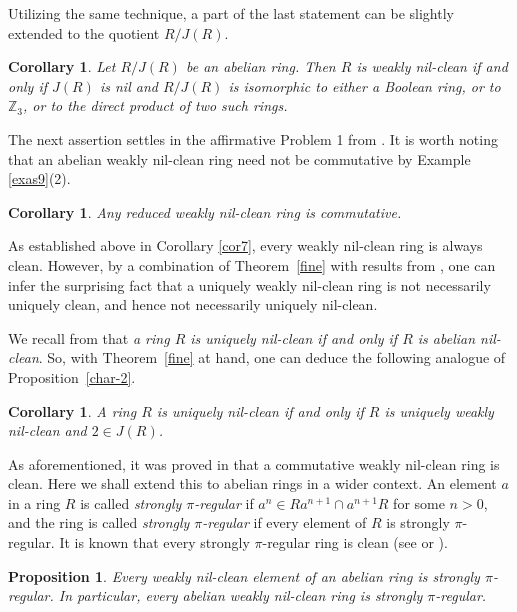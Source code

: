 \documentclass[12]{amsart}
\newtheorem{cor}[thm]{Corollary}
\newtheorem{prop}[thm]{Proposition}
\theoremstyle{definition}
\numberwithin{equation}{section}
\begin{document}
Utilizing the same technique, a part of the last statement can be slightly extended to the quotient $R/J(R)$.

\begin{cor}
Let $R/J(R)$ be an abelian ring. Then $R$ is weakly nil-clean if and only if $J(R)$ is nil and $R/J(R)$ is isomorphic to either a Boolean ring, or to $\mathbb Z_3$, or to the direct product of two such rings.
\end{cor}

The next assertion settles in the affirmative Problem 1 from \cite{DM14}. 
It is worth noting that an abelian weakly nil-clean ring need not be commutative by Example \ref{exas9}(2).

\begin{cor}\label{commut}
Any reduced weakly nil-clean ring is commutative.
\end{cor}

As established above in Corollary \ref{cor7}, every weakly nil-clean ring is always clean. However, by a combination of Theorem~\ref{fine} with results from \cite{NZ04}, one can infer the surprising fact that a uniquely weakly nil-clean ring is not necessarily uniquely clean, and hence not necessarily uniquely nil-clean.

We recall from \cite[Theorem 5.4]{Ch} that {\it a ring $R$ is uniquely nil-clean if and only if $R$ is abelian nil-clean}. So, with Theorem~\ref{fine} at hand, one can deduce the following analogue of Proposition~\ref{char-2}.

\begin{cor} A ring $R$ is uniquely nil-clean if and only if $R$ is uniquely weakly nil-clean and $2\in J(R)$.
\end{cor}

As aforementioned, it was proved in \cite{DM14} that a commutative weakly nil-clean ring is clean. Here we shall extend this to abelian rings in a wider context. An element $a$ in a ring $R$ is called {\it strongly $\pi$-regular} if $a^n\in Ra^{n+1}\cap a^{n+1}R$ for some $n>0$, and the ring is called {\it strongly $\pi$-regular} if every element of $R$ is strongly $\pi$-regular. It is known that every strongly $\pi$-regular ring is clean (see \cite{BM88} or \cite{N99}).

\begin{prop}\label{pireg}
Every weakly nil-clean element of an abelian ring is strongly $\pi$-regular. In particular, every abelian weakly nil-clean ring is strongly $\pi$-regular.
\end{prop}
\end{document}
